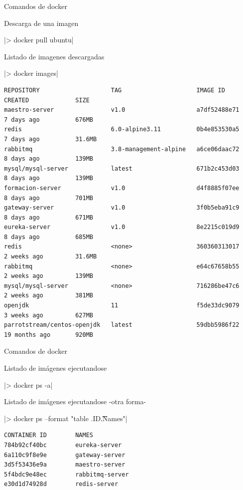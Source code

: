 \documentclass[10pt]{beamer}
\begin{document}
\begin{frame}[fragile]{Comandos de docker}

\alert{Descarga de una imagen}

|> docker pull ubuntu|

\alert{Listado de imagenes descargadas}

|> docker images|

\begin{verbatim}
REPOSITORY                    TAG                     IMAGE ID            CREATED             SIZE
maestro-server                v1.0                    a7df52488e71        7 days ago          676MB
redis                         6.0-alpine3.11          0b4e853530a5        7 days ago          31.6MB
rabbitmq                      3.8-management-alpine   a6ce06daac72        8 days ago          139MB
mysql/mysql-server            latest                  671b2c453d03        8 days ago          139MB
formacion-server              v1.0                    d4f8885f07ee        8 days ago          701MB
gateway-server                v1.0                    3f0b5eba91c9        8 days ago          671MB
eureka-server                 v1.0                    8e2215c019d9        8 days ago          685MB
redis                         <none>                  360360313017        2 weeks ago         31.6MB
rabbitmq                      <none>                  e64c67658b55        2 weeks ago         139MB
mysql/mysql-server            <none>                  716286be47c6        2 weeks ago         381MB
openjdk                       11                      f5de33dc9079        3 weeks ago         627MB
parrotstream/centos-openjdk   latest                  59dbb5986f22        19 months ago       920MB
\end{verbatim}


\end{frame}


\begin{frame}[fragile]{Comandos de docker}

\alert{Listado de imágenes ejecutandose}

|> docker ps -a|

\alert{Listado de imágenes ejecutandose -otra forma-}

|> docker ps --format "table {{.ID}}\t{{.Names}}"|

\begin{verbatim}
CONTAINER ID        NAMES
784b92cf40bc        eureka-server
6a110c9f8e9e        gateway-server
3d5f53436e9a        maestro-server
5f4bdc9e48ec        rabbitmq-server
e30d1d74928d        redis-server
\end{verbatim}


\end{frame}
\end{document}
